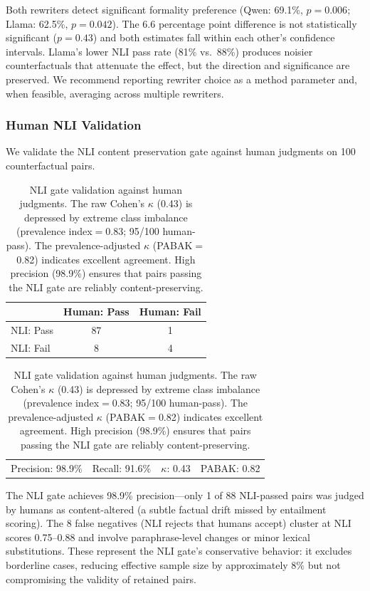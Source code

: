\documentclass[11pt,a4paper]{article}
\begin{document}
Both rewriters detect significant formality preference (Qwen: 69.1\%, $p{=}0.006$; Llama: 62.5\%, $p{=}0.042$).
The 6.6 percentage point difference is not statistically significant ($p{=}0.43$) and both estimates fall within each other's confidence intervals.
Llama's lower NLI pass rate (81\% vs.\ 88\%) produces noisier counterfactuals that attenuate the effect, but the direction and significance are preserved.
We recommend reporting rewriter choice as a method parameter and, when feasible, averaging across multiple rewriters.

\subsubsection{Human NLI Validation}
\label{sec:human_validation}

We validate the NLI content preservation gate against human judgments on 100 counterfactual pairs.

\begin{table}[t]
\centering
\small
\begin{tabular}{@{}lcc@{}}
\toprule
& \textbf{Human: Pass} & \textbf{Human: Fail} \\
\midrule
NLI: Pass & 87 & 1 \\
NLI: Fail & 8 & 4 \\
\bottomrule
\end{tabular}
\vspace{0.3em}

\begin{tabular}{@{}llll@{}}
Precision: 98.9\% & Recall: 91.6\% & $\kappa$: 0.43 & PABAK: 0.82 \\
\end{tabular}
\caption{NLI gate validation against human judgments. The raw Cohen's $\kappa$ (0.43) is depressed by extreme class imbalance (prevalence index$=$0.83; 95/100 human-pass). The prevalence-adjusted $\kappa$ (PABAK$=$0.82) indicates excellent agreement. High precision (98.9\%) ensures that pairs passing the NLI gate are reliably content-preserving.}
\label{tab:human_nli}
\end{table}

The NLI gate achieves 98.9\% precision---only 1 of 88 NLI-passed pairs was judged by humans as content-altered (a subtle factual drift missed by entailment scoring).
The 8 false negatives (NLI rejects that humans accept) cluster at NLI scores 0.75--0.88 and involve paraphrase-level changes or minor lexical substitutions.
These represent the NLI gate's conservative behavior: it excludes borderline cases, reducing effective sample size by approximately 8\% but not compromising the validity of retained pairs.
\end{document}
